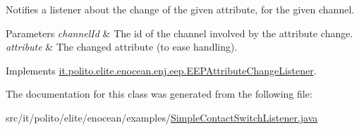 Notifies a listener about the change of the given attribute, for the given channel. 
\begin{DoxyParams}{Parameters}
{\em channel\+Id} & The id of the channel involved by the attribute change. \\
\hline
{\em attribute} & The changed attribute (to ease handling). \\
\hline
\end{DoxyParams}


Implements \hyperlink{interfaceit_1_1polito_1_1elite_1_1enocean_1_1enj_1_1eep_1_1_e_e_p_attribute_change_listener_a8ed543f4de048252dfd133116d488382}{it.\+polito.\+elite.\+enocean.\+enj.\+eep.\+E\+E\+P\+Attribute\+Change\+Listener}.



The documentation for this class was generated from the following file\+:\begin{DoxyCompactItemize}
\item 
src/it/polito/elite/enocean/examples/\hyperlink{_simple_contact_switch_listener_8java}{Simple\+Contact\+Switch\+Listener.\+java}\end{DoxyCompactItemize}
